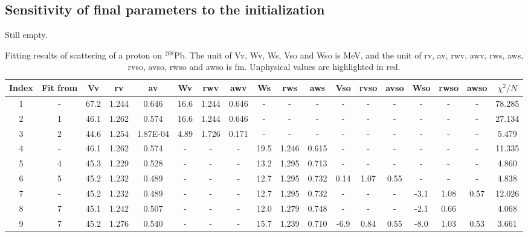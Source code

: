 \subsection{Sensitivity of final parameters to the initialization}
Still empty. 

\begin{landscape}
	\begin{table}[t]
		\centering
		\caption{Fitting results of scattering of a proton on $^{208}$Pb. 
		The unit of Vv, Wv, Ws, Vso and Wso is MeV, and the unit of rv, av, rwv, awv, rws, aws, rvso, avso, rwso and awso is fm. 
	    Unphysical values are highlighted in red. }
		\label{proton_table}
		\footnotesize
		\begin{tabular}{cccccccccccccccccc}
			\hline
			\hline
			Index & Fit from & Vv  & rv  & av  & Wv & rwv & awv  & Ws & rws & aws & Vso & rvso & avso & Wso & rwso & awso & $\chi^2/N$ \\
			\hline
			1     & -          & 67.2     & 1.244   & 0.646    & 16.6     & 1.244    & 0.646    & -        & -        & -        & -         & -         & -         & -         & -         & -        & 78.285   \\
			2     & 1          & 46.1     & 1.262   & 0.574    & 16.6     & 1.244    & 0.646    & -        & -        & -        & -         & -         & -         & -         & -         & -        & 27.134   \\
			3     & 2          & 44.6     & 1.254   & 1.87E-04 & 4.89     & 1.726    & 0.171    & -        & -        & -        & -         & -         & -         & -         & -         & -        & 5.479    \\
			4     & -          & 46.1     & 1.262   & 0.574    & -        & -        & -        & 19.5     & 1.246    & 0.615    & -         & -         & -         & -         & -         & -        & 11.335   \\
			5     & 4          & 45.3     & 1.229   & 0.528    & -        & -        & -        & 13.2     & 1.295    & 0.713    & -         & -         & -         & -         & -         & -        & 4.860    \\
			6     & 5          & 45.2     & 1.232   & 0.489    & -        & -        & -        & 12.7     & 1.295    & 0.732    & 0.14     & 1.07     & 0.55     & -         & -         & -        & 4.838    \\
			7     & -          & 45.2     & 1.232   & 0.489    & -        & -        & -        & 12.7     & 1.295    & 0.732    & -         & -         & -         & -3.1    & 1.08      & 0.57     & 12.026   \\
			8     & 7          & 45.1     & 1.242   & 0.507    & -        & -        & -        & 12.0     & 1.279    & 0.748    & -         & -         & -         & -2.1     & 0.66     & \color{red}{-0.028}   & 4.068    \\
			9     & 7          & 45.2     & 1.276   & 0.540    & -        & -        & -        & 15.7     & 1.239    & 0.710    & -6.9     & 0.84     & 0.55     & -8.0     & 1.03      & 0.53     & 3.661   \\
			\hline
			\hline
		\end{tabular}
	\end{table}


\end{landscape}
